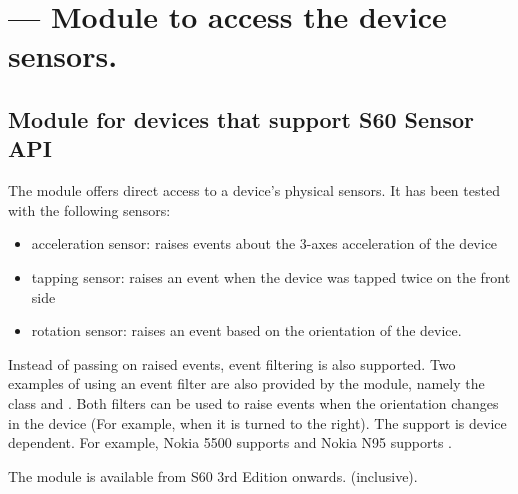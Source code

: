 %
%
%

\section{ ---
  Module to access the device sensors.}
\label{sec:sensor}


\subsection{Module for devices that support S60 Sensor API}
\label{subsec:sensorapi}

The  module offers direct access to a device's physical sensors. It has been tested with the following sensors:
\begin{itemize}
\item acceleration sensor: raises events about the 3-axes acceleration of the device
\item tapping sensor: raises an event when the device was tapped twice on the front side
\item rotation sensor: raises an event based on the orientation of the device.
\end{itemize}

Instead of passing on raised events, event filtering is also supported. Two 
examples of using an event filter are also provided by the  
module, namely the class  and 
. Both filters can be used to raise events when the 
orientation changes in the device (For example, when it is turned to the right). The support 
is device dependent. For example, Nokia 5500 supports  and 
Nokia N95 supports .

\begin{notice}[note]
The module  is available from S60 3rd Edition onwards. 
(inclusive).
\end{notice}

